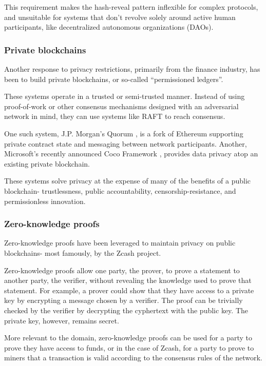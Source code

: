 \documentclass[11pt]{article}
\begin{document}
This requirement makes the hash-reveal pattern inflexible for complex
protocols, and unsuitable for systems that don't revolve solely around
active human participants, like decentralized autonomous organizations
(DAOs).

\subsubsection{Private blockchains}

Another response to privacy restrictions, primarily from the finance
industry, has been to build private blockchains, or so-called
``permissioned ledgers''.

These systems operate in a trusted or semi-trusted manner. Instead of
using proof-of-work or other consensus mechanisms designed with an
adversarial network in mind, they can use systems like RAFT to reach
consensus.

One such system, J.P. Morgan's Quorum \cite{quorum}, is a fork of
Ethereum supporting private contract state and messaging between
network participants. Another, Microsoft's recently announced Coco
Framework \cite{coco}, provides data privacy atop an existing private
blockchain.

These systems solve privacy at the expense of many of the benefits of
a public blockchain- trustlessness, public accountability,
censorship-resistance, and permissionless innovation.

\subsubsection{Zero-knowledge proofs}

Zero-knowledge proofs have been leveraged to maintain privacy on
public blockchains- most famously, by the Zcash \cite{zcash} project.

Zero-knowledge proofs allow one party, the prover, to prove a
statement to another party, the verifier, without revealing the
knowledge used to prove that statement.  For example, a prover could
show that they have access to a private key by encrypting a message
chosen by a verifier. The proof can be trivially checked by the
verifier by decrypting the cyphertext with the public key. The private
key, however, remains secret.

More relevant to the domain, zero-knowledge proofs can be used for a
party to prove they have access to funds, or in the case of Zcash, for
a party to prove to miners that a transaction is valid according to
the consensus rules of the network.
\end{document}
